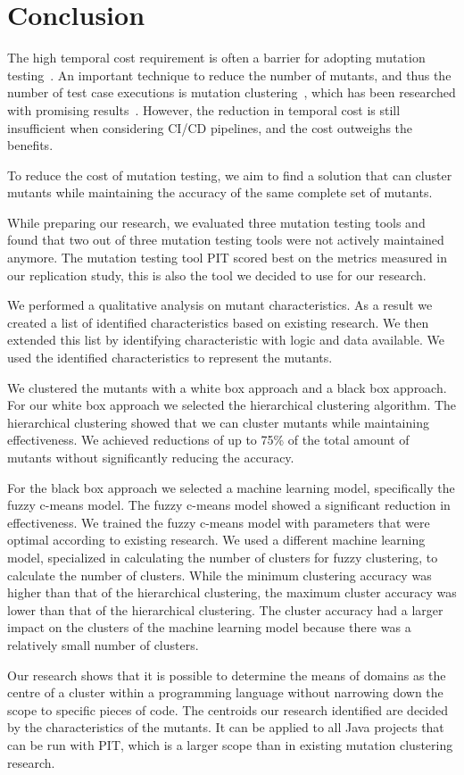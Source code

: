 \documentclass[conference,draftclsnofoot,onecolumn]{IEEEtran}
\begin{document}
\section{Conclusion}
\label{ch:conclusion}
The high temporal cost requirement is often a barrier for adopting mutation testing~\cite{Pizzoleto2019}. An important technique to reduce the number of mutants, and thus the number of test case executions is mutation clustering~\cite{Ma2016,Yu2019PossibilityScope}, which has been researched with promising results~\cite{Ji2009,Wilinski2015,Ma2016}. 
However, the reduction in temporal cost is still insufficient when considering CI/CD pipelines, and the cost outweighs the benefits.

To reduce the cost of mutation testing, we aim to find a solution that can cluster mutants while maintaining the accuracy of the same complete set of mutants. 

While preparing our research, we evaluated three mutation testing tools and found that two out of three mutation testing tools were not actively maintained anymore. The mutation testing tool PIT scored best on the metrics measured in our replication study, this is also the tool we decided to use for our research.

We performed a qualitative analysis on mutant characteristics.
As a result we created a list of identified characteristics based on existing research. We then extended this list by identifying characteristic with logic and data available.
We used the identified characteristics to represent the mutants.

We clustered the mutants with a white box approach and a black box approach. For our white box approach we selected the hierarchical clustering algorithm. The hierarchical clustering showed that we can cluster mutants while maintaining effectiveness.
We achieved reductions of up to 75\% of the total amount of mutants without significantly reducing the accuracy.

For the black box approach we selected a machine learning model, specifically the fuzzy c-means model. The fuzzy c-means model showed a significant reduction in effectiveness. We trained the fuzzy c-means model with parameters that were optimal according to existing research. 
We used a different machine learning model, specialized in calculating the number of clusters for fuzzy clustering, to calculate the number of clusters. While the minimum clustering accuracy was higher than that of the hierarchical clustering, the maximum cluster accuracy was lower than that of the hierarchical clustering. The cluster accuracy had a larger impact on the clusters of the machine learning model because there was a relatively small number of clusters.

Our research shows that it is possible to determine the means of domains as the centre of a cluster within a programming language without narrowing down the scope to specific pieces of code. The centroids our research identified are decided by the characteristics of the mutants.
It can be applied to all Java projects that can be run with PIT, which is a larger scope than in existing mutation clustering research.

\printbibliography[heading=bibintoc]
\end{document}
